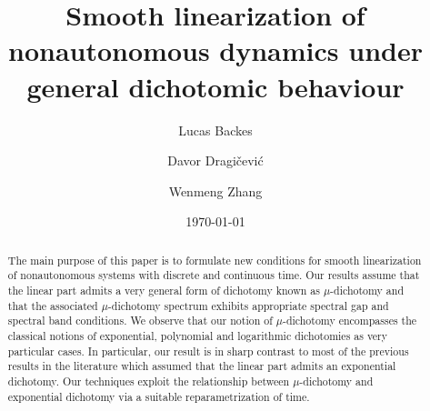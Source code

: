\documentclass[reqno, a4paper, 10pt]{amsart}
\theoremstyle{plain}
\numberwithin{equation}{section}
\theoremstyle{remark}
\begin{document}
\title [Smooth linearization of nonautonomous dynamics]{Smooth linearization of nonautonomous dynamics under general dichotomic behaviour}


\author[Lucas Backes]{Lucas Backes }
\address[Lucas Backes]
{Department of Mathematics\\
    Universidade Federal do Rio Grande do Sul\\
    Av. Bento Goncalves 9500, CEP 91509-900, Porto Alegre, RS, Brazil}

\author[Davor Dragi\v cevi\'c]{Davor Dragi\v cevi\'c  }
\address[Davor Dragi\v cevi\'c]
{Faculty of Mathematics\\
    University of Rijeka\\
    Rijeka 51000, Croatia}

\author[Wenmeng Zhang]{Wenmeng Zhang }
\address[Wenmeng Zhang]
{School of Mathematical Sciences\\
    Chongqing Normal University\\
    Chongqing 401331, P.R.China}




\date{\today}

  


\begin{abstract}
The main purpose of this paper is to formulate new conditions for smooth linearization of nonautonomous systems with discrete and continuous time. Our results assume that the linear part admits a very general form of dichotomy known as $\mu$-dichotomy and that the associated $\mu$-dichotomy spectrum exhibits appropriate spectral gap and spectral band conditions. We observe that our notion of $\mu$-dichotomy encompasses the classical notions of exponential, polynomial and logarithmic dichotomies as very particular cases. In particular, our result is in sharp contrast to  most of the previous results in the literature which  assumed that the linear part admits an exponential dichotomy. Our techniques exploit the relationship between $\mu$-dichotomy and exponential dichotomy via a suitable reparametrization of time.
\end{abstract}
\end{document}

